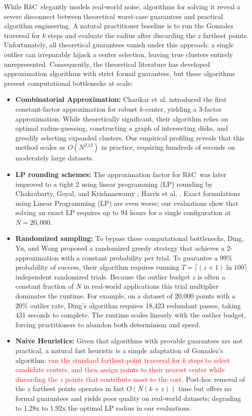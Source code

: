 \documentclass[twoside,leqno,twocolumn]{article}
\newcommand{\rkc}{R$k$C}
\begin{document}
While \rkc~elegantly models real-world noise, algorithms for solving it reveal a severe disconnect between theoretical worst-case guarantees and practical algorithm engineering. A natural practitioner baseline is to run the Gonzalez traversal for $k$ steps and evaluate the radius after discarding the $z$ farthest points. Unfortunately, all theoretical guarantees vanish under this approach: a single outlier can irreparably hijack a center selection, leaving true clusters entirely unrepresented. Consequently, the theoretical literature has developed approximation algorithms with strict formal guarantees, but these algorithms present computational bottlenecks at scale:
\begin{itemize}
    \item \textbf{Combinatorial Approximation:} Charikar et al. \cite{charikar2001} introduced the first constant-factor approximation for robust $k$-center, yielding a 3-factor approximation. While theoretically significant, their algorithm relies on optimal radius-guessing, constructing a graph of intersecting disks, and greedily selecting expanded clusters. Our empirical profiling reveals that this method scales as $O(N^{2.12})$ in practice, requiring hundreds of seconds on moderately large datasets.
    \item \textbf{LP rounding schemes:} The approximation factor for \rkc~was later improved to a tight 2 using linear programming (LP) rounding by Chakrabarty, Goyal, and Krishnaswamy \cite{}; Harris et al. \cite{}. Exact formulations using Linear Programming (LP) are even worse; our evaluations show that solving an exact LP requires up to 94 hours for a single configuration at $N=20,000$.
    \item \textbf{Randomized sampling:} To bypass these computational bottlenecks, Ding, Yu, and Wang \cite{ding2019} proposed a randomized greedy strategy that achieves a 2-approximation with a constant probability per trial. To guarantee a 99\% probability of success, their algorithm requires running $T = \lceil(z+1) \ln 100\rceil$ independent randomized trials.
    Because the outlier budget $z$ is often a constant fraction of $N$ in real-world applications this trial multiplier dominates the runtime. For example, on a dataset of 20,000 points with a 20\% outlier rate, Ding's algorithm requires 18,423 redundant passes, taking 431 seconds to complete. The runtime scales linearly with the outlier budget, forcing practitioners to abandon both determinism and speed.
   \item  \textbf{Naive Heuristics:} Given that algorithms with provable guarantees are not practical, a natural fast heuristic is a simple adaptation of Gonzalez's algorithm: \textcolor{red}{run the standard farthest-point traversal for $k$ steps to select candidate centers, and then assign points to their nearest center while discarding the $z$ points that contribute most to the cost.} Post-hoc removal of the $z$ farthest points operates in fast $O(N(k+z))$ time but offers no formal guarantees and yields poor quality on real-world datasets; degrading to 1.28x to 1.92x the optimal LP radius in our evaluations.
\end{itemize}
\end{document}
